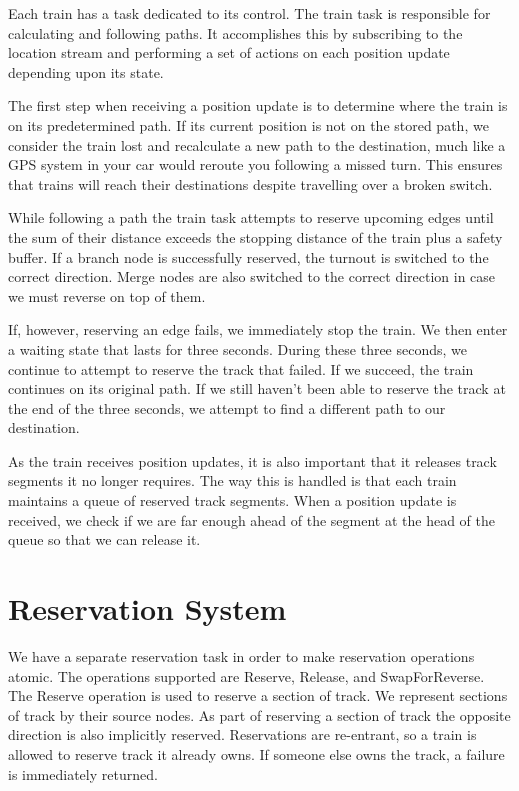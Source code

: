 \documentclass{article}
\begin{document}
Each train has a task dedicated to its control. The train task is responsible for calculating and following paths. It accomplishes this by subscribing to the location stream and performing a set of actions on each position update depending upon its state.

The first step when receiving a position update is to determine where the train is on its predetermined path. If its current position is not on the stored path, we consider the train lost and recalculate a new path to the destination, much like a GPS system in your car would reroute you following a missed turn. This ensures that trains will reach their destinations despite travelling over a broken switch.

While following a path the train task attempts to reserve upcoming edges until the sum of their distance exceeds the stopping distance of the train plus a safety buffer. If a branch node is successfully reserved, the turnout is switched to the correct direction. Merge nodes are also switched to the correct direction in case we must reverse on top of them. 

If, however, reserving an edge fails, we immediately stop the train. We then enter a waiting state that lasts for three seconds. During these three seconds, we continue to attempt to reserve the track that failed. If we succeed, the train continues on its original path. If we still haven't been able to reserve the track at the end of the three seconds, we attempt to find a different path to our destination.

As the train receives position updates, it is also important that it releases track segments it no longer requires. The way this is handled is that each train maintains a queue of reserved track segments. When a position update is received, we check if we are far enough ahead of the segment at the head of the queue so that we can release it.

\section{Reservation System}

We have a separate reservation task in order to make reservation operations atomic. The operations supported are Reserve, Release, and SwapForReverse. The Reserve operation is used to reserve a section of track. We represent sections of track by their source nodes. As part of reserving a section of track the opposite direction is also implicitly reserved. Reservations are re-entrant, so a train is allowed to reserve track it already owns. If someone else owns the track, a failure is immediately returned.
\end{document}
